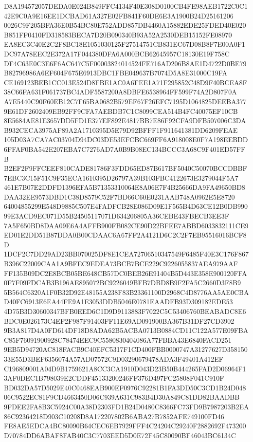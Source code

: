 \documentclass[UTF8,fontset=fandol,zihao=-4,a4paper]{ctexart}
\begin{document}
{{D8A194572057DEDA0E024B849FFC4134F40E308D0100CB4FE98AEB1722C0C142E9C0A9E16EE1DCBAD61A327E02FB841F60DE6E3A1900B24D25161206
0026C9F205BFA36E0B54BC80E752ADD857DB4460A15882EDE25FDED40E020B851FF0410FD318583BECA7D20B090340B93A52A2530DEB15152FE08970
EA8EC3C40E2C2F8BC18E1051030125F27514751CB831EC67D08B8F7E00A0F1DC97A78EEC2E372A17F044380DFA6A000BCB62645957C18130E19F758C
DF4C63E0C3E6F6AC647C5F00003824014524FE716AD206B8AE1D4722D0BE79B82796986A6EF604F675E6913DBC1FBE049637B7074D5A8E31000C19FA
CE169123BEB1CC013E524D8FBE1AC0A6FEE1A71F295852C48D9F40BCEA8F38C66FA631F061737BC4ADF5587200A8DBFE6538964FF599F74A2D807F0A
A7E5440C90F60EB12C7F65BA0682B579EF67F26EFC7195D1064825DEEBA3779E61DF2602409EB92FF9CFA7AEBDB7C1C8099CEA514B4FC40075EF10CB
8E5684AE81E3657DD5FD1E377EF892E4817BB7E86F92CFA9DFB507006C3DAB932CECA3975AF89A2A1710395D5E79D92BFFF1F911641381DD6209FEAE
105D03A7CA7AC03704D94DC03DE53EFCBC669FF6A918008E0F7A198EEBDD6FFAF0BA542E207EBA7C7276AD7A0B9B08EC134BCCC3A68C9F401ED57FFB
B2EF2F9FFCEEF810CADE81786F3FDD65ED87B617BF5040C50070BCCDBBF7EBC3C15F51C9F35ECA1610395D26797A39B103FBC4122673E3279044F5A7
461E7B07E2DDFD1396EFA5B71353310064E8A06E7F4B25666DA9FA49650BD8DAA32EE9573DBD1C38D8579C52F7BD66C60E0231AAB748A0962E5E8720
64004855299E548D9885C507E4FADFCB28E086D09E1F565B4D63CE12B0DB99099E3ACD9EC071D55B24505117071D634206805A36CEBE43FBECB3EE3F
7A5F650BD8DAA09E6A4AFFB900FB082CE90D22BFEE7ABBD6033832111CE9ED01E2DD51B87DDA0B00CDAAC6A67FF2A4121D6C2C2F7EB95516016BCF8D
1DCF2C7DD29AD23BB070025DF8E1CEA72706510347549F6485F40E3C176F867B396C22009CAA1A9BFEC9EDEA73BCB7BCE229C9226055837AEA979AAF
FF135B09DC2E8BCB05BE648CB57DC0BEB26E91404B5D443E358E900120FFA0F7F09FDCAB3B196AE895072BC9226049BFB7DBD8B9F2FA5C2660D3F8B9
5B564C6320A1F0B32D92E48155A238F83B23361100D2968C4D8776AA5AE0CBAD40FC6913E6EA44FE9A1E3053DDB5046E0781EAADFB93D309182EDE53
4D75B3D30600347BFB0EED6C1D9D9113883F7022C5C53406760BEABADC8E6BDC0E026173C4EF2F987F91403FF11E69AD091900BA367B31DF27CD3902
9B3A817D4A0FD614DF18D8ADA62B5ACBA0713B0884CD11C122A577E09FBAC85F76091900928C78474EEC9C5580830404086A77FBBA43E6840FACD251
9EB5D94720AC818FACB9C40EFC5317F1CD400FBB0000747A31277627D35815033E55D3BEF6356074A57AD07572C9D03290679478ADA3F49401A412EF
C196809001A04D9B1759621A8CC3CA1910D043D23B50B444265FAD2D06964F13AF0DEC1B798039E2CDDF45133200246FF376D497FC25808F041C910F
BD032DA57D5029E40C0468EAB900EF0976C92281B1FA3DD50C3CD1B24D04806C9522EC81F9CD4663450D06C939A631C983B4D30A849C81DD82BAADBB
9FDEE2FA8B3C5924C00A38D2303FD1B24D0480C8366FC73FD9B7987203B2EA86C92364218D903C10208D8A172207802B6ABA27B7852AFE749100FD46
FE8AE5EDCA4BC80090B64CEC6EB7929FFF4C24204C29240F2882692F473200D70784DD6ABAF8FAB40C3C7703EED5D0E72F45C80090BF46043BC6134C
}}
\end{document}
